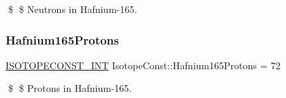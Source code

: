 \$ \$ Neutrons in Hafnium-\/165. \mbox{\label{group___isotope_const-_hafnium-_hf165_gace3c059fed5818b41a1c76f8cc54d3c5}} 
\subsubsection{\texorpdfstring{Hafnium165\+Protons}{Hafnium165Protons}}
{\footnotesize\ttfamily \mbox{\hyperlink{group___isotope_const-_macros_ga5f18360b3e99483a35c32d789e62621c}{I\+S\+O\+T\+O\+P\+E\+C\+O\+N\+S\+T\+\_\+\+I\+NT}} Isotope\+Const\+::\+Hafnium165\+Protons = 72}

\$ \$ Protons in Hafnium-\/165. 